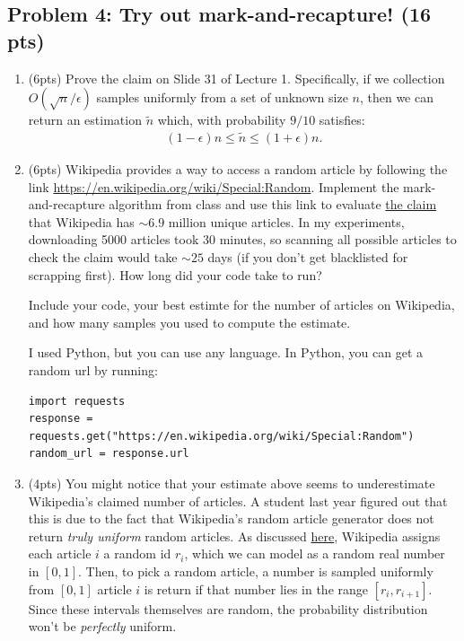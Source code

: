\documentclass[10pt]{article}
\begin{document}
\subsection{Problem 4: Try out mark-and-recapture! (16 pts)}
\begin{enumerate}
	\item (6pts) Prove the claim on Slide 31 of Lecture 1. Specifically, if we collection $O(\sqrt{n}/\epsilon)$ samples uniformly from a set of unknown size $n$, then we can return an estimation $\tilde{n}$ which, with probability $9/10$ satisfies:
	\begin{align*}
		(1-\epsilon)n \leq \tilde{n} \leq (1+\epsilon)n.
	\end{align*}
	
	\item (6pts) Wikipedia provides a way to access a random article by following the link \url{https://en.wikipedia.org/wiki/Special:Random}. Implement the mark-and-recapture algorithm from class and use this link to evaluate \href{https://en.wikipedia.org/wiki/Wikipedia:Size_of_Wikipedia}{the claim} that Wikipedia has $\sim 6.9$ million unique articles. In my experiments, downloading 5000 articles took 30 minutes, so scanning all possible articles to check the claim would take $\sim 25$ days (if you don't get blacklisted for scrapping first). How long did your code take to run?
	
	Include your code, your best estimte for the number of articles on Wikipedia, and how many samples you used to compute the estimate. 
	
	 I  used Python, but you can use any language. In Python, you can get a random url by running:
\begin{verbatim}
import requests
response = requests.get("https://en.wikipedia.org/wiki/Special:Random")
random_url = response.url	
\end{verbatim}

\item (4pts) You might notice that your estimate above seems to underestimate Wikipedia's claimed number of articles. A student last year figured out that this is due to the fact that 
Wikipedia's random article generator does not return \emph{truly uniform} random articles. As discussed \href{https://en.wikipedia.org/wiki/Wikipedia:FAQ/Technical#random}{here}, Wikipedia assigns each article $i$ a random id $r_i$, which we can model as a random real number in $[0, 1]$. Then, to pick a random article, a number is sampled uniformly from $[0, 1]$ article $i$ is return if that number lies in the range $[r_i, r_{i+1}]$. Since these intervals themselves are random, the probability distribution won't be \emph{perfectly} uniform.\\


\end{enumerate}
\end{document}
